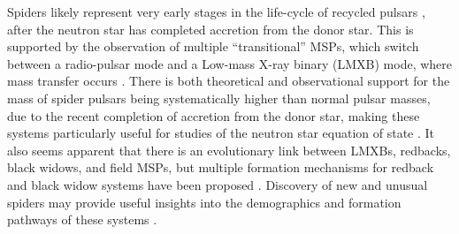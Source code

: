 \documentclass[fleqn,usenatbib]{mnras}
\begin{document}
Spiders likely represent very early stages in the life-cycle of recycled pulsars \citep{2014ApJ...786L...7B}, after the neutron star has completed accretion from the donor star. This is supported by the observation of multiple ``transitional'' MSPs, which switch between a radio-pulsar mode and a Low-mass X-ray binary (LMXB) mode, where mass transfer occurs \citep[e.g.][]{2009Sci...324.1411A,2015ApJ...800L..12R}. There is both theoretical \citep{2014ApJ...786L...7B} and observational \citep{2019ApJ...872...42S,2023NatAs...7..451C} support for the mass of spider pulsars being systematically higher than normal pulsar masses, due to the recent completion of accretion from the donor star, making these systems particularly useful for studies of the neutron star equation of state \citep{2016ARA&A..54..401O}.   
It also seems apparent that there is an evolutionary link between LMXBs, redbacks, black widows, and field MSPs, but multiple formation mechanisms for redback and black widow systems have been proposed \citep{2013ApJ...775...27C,2015MNRAS.446.2540S,2020MNRAS.493.2171D,2021MNRAS.500.1592G}. Discovery of new and unusual spiders may provide useful insights into the demographics and formation pathways of these systems \citep{2023Natur.620..961P}. %
\end{document}

